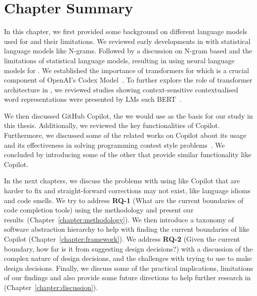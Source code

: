 \section{Chapter Summary}
In this chapter, we first provided some background on different language models used for \cct{} and their limitations. We reviewed early developments in \cct{} with statistical language models like N-grams. Followed by a discussion on N-gram based \cct{} and the limitations of statistical language models, resulting in using neural language models for \cct{}. We established the importance of transformers for \cct{} which is a crucial component of OpenAI's Codex Model~\cite{copilot}. To further explore the role of transformer architecture in \cct{}, we reviewed studies showing context-sensitive contextualised word representations were presented by LMs such BERT~\cite{bert}.

We then discussed GitHub Copilot, the \cct{} we would use as the basis for our study in this thesis. Additionally, we reviewed the key functionalities of Copilot.
Furthermore, we discussed some of the related works on Copilot about its usage~\cite{Vaithilingam2022} and its effectiveness in solving programming contest style problems~\cite{empirical_eval}. We concluded by introducing some of the other \cct{} that provide similar functionality like Copilot.

In the next chapters, we discuss the problems with using \cct{} like Copilot that are harder to fix and straight-forward corrections may not exist, like language idioms and code smells. 
We try to address \textbf{RQ-1} (What are the current boundaries of code completion tools) using the methodology and present our results~(Chapter~\ref{chapter:methodology}).
We then introduce a taxonomy of software abstraction hierarchy to help with finding the current boundaries of \cct{} like Copilot (Chapter~\ref{chapter:framework}). We address \textbf{RQ-2} (Given the current boundary, how far is it from suggesting design decisions?) with a discussion of the complex nature of design decisions, and the challenges with trying to use \cct{} to make design decisions.
Finally, we discuss some of the practical implications, limitations of our findings and also provide some future directions to help further research in \cct{} (Chapter~\ref{chapter:discussion}).